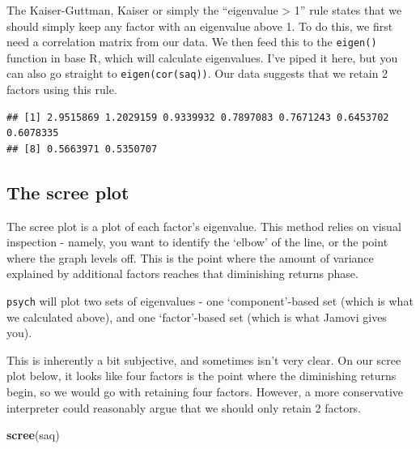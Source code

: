 \documentclass[
]{book}
\newenvironment{Shaded}{\begin{snugshade}}{\end{snugshade}}
\newcommand{\FunctionTok}[1]{\textcolor[rgb]{0.13,0.29,0.53}{\textbf{#1}}}
\newcommand{\NormalTok}[1]{#1}
\newcommand{\OtherTok}[1]{\textcolor[rgb]{0.56,0.35,0.01}{#1}}
\newcommand{\SpecialCharTok}[1]{\textcolor[rgb]{0.81,0.36,0.00}{\textbf{#1}}}
\begin{document}
The Kaiser-Guttman, Kaiser or simply the ``eigenvalue \textgreater{} 1'' rule states that we should simply keep any factor with an eigenvalue above 1. To do this, we first need a correlation matrix from our data. We then feed this to the \texttt{eigen()} function in base R, which will calculate eigenvalues. I've piped it here, but you can also go straight to \texttt{eigen(cor(saq))}. Our data suggests that we retain 2 factors using this rule.

\begin{Shaded}
\end{Shaded}

\begin{verbatim}
## [1] 2.9515869 1.2029159 0.9339932 0.7897083 0.7671243 0.6453702 0.6078335
## [8] 0.5663971 0.5350707
\end{verbatim}

\hypertarget{the-scree-plot}{%
\subsection{The scree plot}\label{the-scree-plot}}

The scree plot is a plot of each factor's eigenvalue. This method relies on visual inspection - namely, you want to identify the `elbow' of the line, or the point where the graph levels off. This is the point where the amount of variance explained by additional factors reaches that diminishing returns phase.

\texttt{psych} will plot two sets of eigenvalues - one `component'-based set (which is what we calculated above), and one `factor'-based set (which is what Jamovi gives you).

This is inherently a bit subjective, and sometimes isn't very clear. On our scree plot below, it looks like four factors is the point where the diminishing returns begin, so we would go with retaining four factors. However, a more conservative interpreter could reasonably argue that we should only retain 2 factors.

\begin{Shaded}
\begin{Highlighting}[]
\FunctionTok{scree}\NormalTok{(saq)}
\end{Highlighting}
\end{Shaded}
\end{document}
